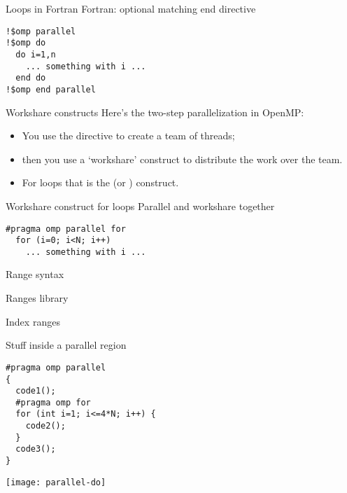 \begin{fortran}
\begin{numberedframe}{Loops in Fortran}
Fortran: optional matching end directive
\begin{lstlisting}
!$omp parallel
!$omp do
  do i=1,n
    ... something with i ...
  end do
!$omp end parallel
\end{lstlisting}
\end{numberedframe}
\end{fortran}

\begin{numberedframe}{Workshare constructs}
  Here's the two-step parallelization in OpenMP:
  \begin{itemize}
  \item You use the  directive to create a team of
    threads;
  \item then you use a `workshare' construct to distribute the
    work over the team.
  \item For loops that is the  (or ) construct.
  \end{itemize}
\end{numberedframe}

\begin{numberedframe}{Workshare construct for loops}
Parallel and workshare together
\begin{lstlisting}
#pragma omp parallel for
  for (i=0; i<N; i++)
    ... something with i ...
\end{lstlisting}
\end{numberedframe}

\begin{cxx}
\begin{numberedframe}{Range syntax}
  
\end{numberedframe}  
\begin{numberedframe}{Ranges library}
  
\end{numberedframe}
\begin{numberedframe}{Index ranges}
  
\end{numberedframe}  
\end{cxx}

\begin{numberedframe}{Stuff inside a parallel region}
\begin{multicols}{2}  
\begin{lstlisting}
#pragma omp parallel
{
  code1();
  #pragma omp for
  for (int i=1; i<=4*N; i++) {
    code2();
  }
  code3();
}
\end{lstlisting}
\columnbreak
\texttt{[image: parallel-do]}
\end{multicols}
\end{numberedframe}


